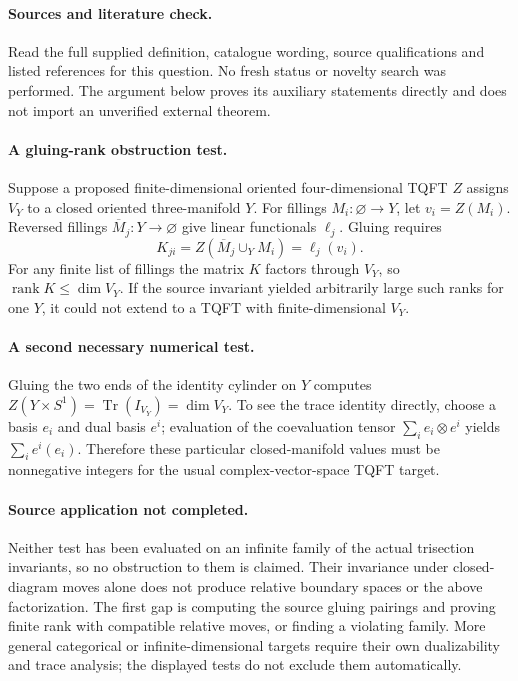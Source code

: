 \documentclass[11pt]{article}
\begin{document}
\paragraph{Sources and literature check.}
Read the full supplied definition, catalogue wording, source qualifications and listed references for this question. No fresh status or novelty search was performed. The argument below proves its auxiliary statements directly and does not import an unverified external theorem.

\paragraph{A gluing-rank obstruction test.} Suppose a proposed finite-dimensional oriented four-dimensional TQFT \(Z\) assigns \(V_Y\) to a closed oriented three-manifold \(Y\). For fillings \(M_i:\varnothing\to Y\), let \(v_i=Z(M_i)\). Reversed fillings \(\overline M_j:Y\to\varnothing\) give linear functionals \(\ell_j\). Gluing requires
\[
 K_{ji}=Z(\overline M_j\cup_Y M_i)=\ell_j(v_i).
\]
For any finite list of fillings the matrix \(K\) factors through \(V_Y\), so \(\operatorname{rank}K\leq\dim V_Y\). If the source invariant yielded arbitrarily large such ranks for one \(Y\), it could not extend to a TQFT with finite-dimensional \(V_Y\).
\paragraph{A second necessary numerical test.} Gluing the two ends of the identity cylinder on \(Y\) computes \(Z(Y\times S^1)=\operatorname{Tr}(I_{V_Y})=\dim V_Y\). To see the trace identity directly, choose a basis \(e_i\) and dual basis \(e^i\); evaluation of the coevaluation tensor \(\sum_i e_i\otimes e^i\) yields \(\sum_i e^i(e_i)\). Therefore these particular closed-manifold values must be nonnegative integers for the usual complex-vector-space TQFT target.
\paragraph{Source application not completed.} Neither test has been evaluated on an infinite family of the actual trisection invariants, so no obstruction to them is claimed. Their invariance under closed-diagram moves alone does not produce relative boundary spaces or the above factorization. The first gap is computing the source gluing pairings and proving finite rank with compatible relative moves, or finding a violating family. More general categorical or infinite-dimensional targets require their own dualizability and trace analysis; the displayed tests do not exclude them automatically.
\end{document}
